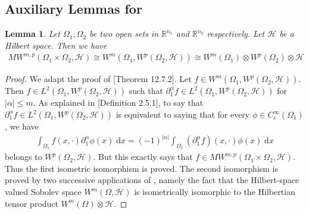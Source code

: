 \documentclass[11pt]{article}
\newcommand{\calH}{\mathcal{H}}
\newcommand{\0}{\mathbf{0}}
\newtheorem{lem}{Lemma}[section]
\begin{document}
\begin{appendix}
\subsection{Auxiliary Lemmas for }
\begin{lem}
    \label{lem:vv_mss}
    Let $\Omega_1,\Omega_2$ be two open sets in $\mathbb{R}^{n_1}$ and $\mathbb{R}^{n_2}$ respectively. Let $\calH$ be a Hilbert space. Then we have
    \begin{align*}
        MW^{m,p}(\Omega_1\times \Omega_2, \calH) \cong W^{m}(\Omega_1, W^{p}(\Omega_2,\calH)) \cong W^m(\Omega_1)\otimes W^p(\Omega_2)\otimes \calH
    \end{align*}
\end{lem}
\begin{proof}
    We adapt the proof of \cite{aubin2011applied}[Theorem 12.7.2]. Let $f\in W^{m}(\Omega_1, W^{p}(\Omega_2,\calH))$. Then $f\in L^2(\Omega_1, W^p(\Omega_2,\calH))$ such that $\partial_1^{\alpha}f\in L^2(\Omega_1, W^p(\Omega_2,\calH))$ for $|\alpha|\leq m$. As explained in \cite{Hytönen2016AnalysisBanachSpaces}[Definition 2.5.1], to say that $\partial_1^{\alpha}f\in L^2(\Omega_1, W^p(\Omega_2,\calH))$ is equivalent to saying that for every $\phi \in C^{\infty}_{c}(\Omega_1)$, we have
    \begin{align}
    \label{eq:vv_weak}
        \int_{\Omega_1}f(x,\cdot)\partial^{\alpha}_{1}\phi(x)\;\mathrm{d}x = (-1)^{|\alpha|}\int_{\Omega_1}(\partial^{\alpha}_{1}f)(x,\cdot)\phi(x)\;\mathrm{d}x
    \end{align}
    belongs to $W^p(\Omega_2,\calH)$. But this exactly says that $f\in MW^{m,p}(\Omega_1\times \Omega_2,\calH)$. Thus the first isometric isomorphism is proved. The second isomorphism is proved by two successive applications of \citet[Theorem 12.7.1]{aubin2011applied}, namely the fact that the Hilbert-space valued Sobolev space $W^m(\Omega,\calH)$ is isometrically isomorphic to the Hilbertian tensor product $W^m(\Omega)\otimes \calH$.   
\end{proof}


\end{appendix}
\end{document}

